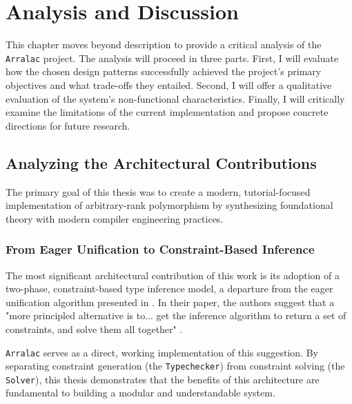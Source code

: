 \chapter{Analysis and Discussion}
\label{chap:AnalysisAndDiscussion}

This chapter moves beyond description to provide a critical analysis of the \texttt{Arralac} project. The analysis will proceed in three parts. First, I will evaluate how the chosen design patterns successfully achieved the project's primary objectives and what trade-offs they entailed. Second, I will offer a qualitative evaluation of the system's non-functional characteristics. Finally, I will critically examine the limitations of the current implementation and propose concrete directions for future research.

\section{Analyzing the Architectural Contributions}
\label{sec:Discussion:Objectives}

The primary goal of this thesis was to create a modern, tutorial-focused implementation of arbitrary-rank polymorphism by synthesizing foundational theory with modern compiler engineering practices.

\subsection{From Eager Unification to Constraint-Based Inference}
The most significant architectural contribution of this work is its adoption of a two-phase, constraint-based type inference model, a departure from the eager unification algorithm presented in \cite{jones-practical-2007}. In their paper, the authors suggest that a "more principled alternative is to... get the inference algorithm to return a set of constraints, and solve them all together" \cite[Sec. 9.6]{jones-practical-2007}.

\texttt{Arralac} serves as a direct, working implementation of this suggestion. By separating constraint generation (the \texttt{Typechecker}) from constraint solving (the \texttt{Solver}), this thesis demonstrates that the benefits of this architecture are fundamental to building a modular and understandable system.

